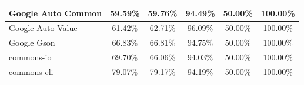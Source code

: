 \documentclass[../../main]{subfiles}
\begin{document}
\begin{table}[!htb]
\begin{tabular}{|l|c|c|c|c|c|}
Google Auto Common            & 59.59\%                                                                                 & 59.76\%                                                                                     & 94.49\%                                                                              & 50.00\%                                                                               & 100.00\%                                                                             \\ \hline
Google Auto Value             & 61.42\%                                                                                 & 62.71\%                                                                                     & 96.09\%                                                                              & 50.00\%                                                                               & 100.00\%                                                                             \\ \hline
Google Gson                   & 66.83\%                                                                                 & 66.81\%                                                                                     & 94.75\%                                                                              & 50.00\%                                                                               & 100.00\%                                                                             \\ \hline
commons-io                    & 69.70\%                                                                                 & 66.06\%                                                                                     & 94.03\%                                                                              & 50.00\%                                                                               & 100.00\%                                                                             \\ \hline
commons-cli                   & 79.07\%                                                                                 & 79.17\%                                                                                     & 94.19\%                                                                              & 50.00\%                                                                               & 100.00\%                                                                             \\ \hline

\end{tabular}
\end{table}
\end{document}

